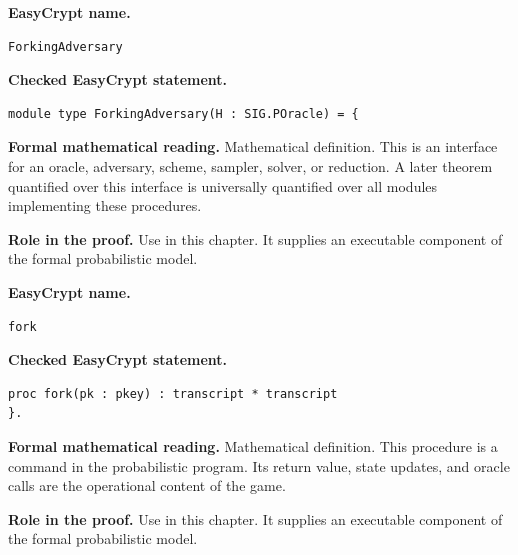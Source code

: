 \begin{formaldefinition}
\noindent\textbf{EasyCrypt name.}
\begin{lstlisting}[language=EasyCrypt,basicstyle=\ttfamily\scriptsize]
ForkingAdversary
\end{lstlisting}
\noindent\textbf{Checked EasyCrypt statement.}
\begin{lstlisting}[language=EasyCrypt,basicstyle=\ttfamily\scriptsize]
module type ForkingAdversary(H : SIG.POracle) = {
\end{lstlisting}
\noindent\textbf{Formal mathematical reading.}
Mathematical definition. This is an interface for an oracle, adversary, scheme, sampler, solver, or reduction.  A later theorem quantified over this interface is universally quantified over all modules implementing these procedures.

\noindent\textbf{Role in the proof.}
Use in this chapter. It supplies an executable component of the formal probabilistic model.

\end{formaldefinition}

\begin{formaldefinition}
\noindent\textbf{EasyCrypt name.}
\begin{lstlisting}[language=EasyCrypt,basicstyle=\ttfamily\scriptsize]
fork
\end{lstlisting}
\noindent\textbf{Checked EasyCrypt statement.}
\begin{lstlisting}[language=EasyCrypt,basicstyle=\ttfamily\scriptsize]
proc fork(pk : pkey) : transcript * transcript
}.
\end{lstlisting}
\noindent\textbf{Formal mathematical reading.}
Mathematical definition. This procedure is a command in the probabilistic program.  Its return value, state updates, and oracle calls are the operational content of the game.

\noindent\textbf{Role in the proof.}
Use in this chapter. It supplies an executable component of the formal probabilistic model.

\end{formaldefinition}

